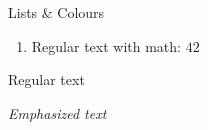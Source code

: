 \documentclass[aspectratio=169,12pt]{beamer}%
\begin{document}
\begin{frame}{Lists \& Colours}
{\begin{enumerate}
\begin{enumerate}
                    \item {}%
                    \item {}%
                    \item {}%
                    \item {}%
                    \item {}%
                    \begin{enumerate}
                        \item {}
                    \end{enumerate}
                \end{enumerate}
                \item Regular text with math: $42$%
            \end{enumerate}
        }%
        {%
            \begin{description}[Emphasis]
                \item [Regular] Regular text
                \item [Emphasis] \emph{Emphasized text}
                \item [Alert] 
            \end{description}
        }%
    \end{frame}
\end{document}
